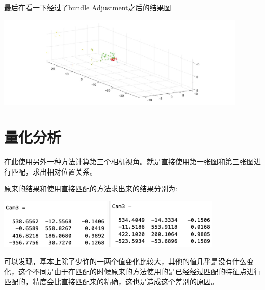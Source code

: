 最后在看一下经过了bundle Adjustment之后的结果图
\begin{center}
    \includegraphics[width=0.9\textwidth]{figures/bundleadjustment.jpg}
\end{center}

\section{量化分析}
在此使用另外一种方法计算第三个相机视角。就是直接使用第一张图和第三张图进行匹配，求出相对位置关系。

原来的结果和使用直接匹配的方法求出来的结果分别为:
\begin{center}
    \includegraphics[width=0.4\textwidth]{figures/test1.png}
    \includegraphics[width=0.4\textwidth]{figures/test2.png}
\end{center}
可以发现，基本上除了少许的一两个值变化比较大，其他的值几乎是没有什么变化，这个不同是由于在匹配的时候原来的方法使用的是已经经过匹配的特征点进行匹配的，精度会比直接匹配来的精确，这也是造成这个差别的原因。

